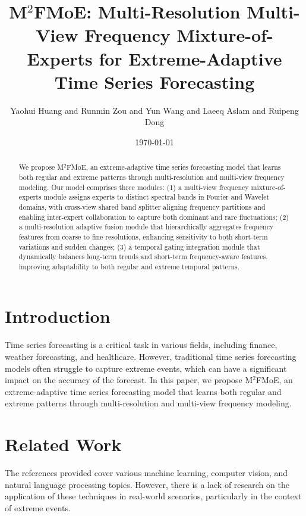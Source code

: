 \documentclass{article}
\begin{document}
\title{M$^2$FMoE: Multi-Resolution Multi-View Frequency Mixture-of-Experts for Extreme-Adaptive Time Series Forecasting}
\author{Yaohui Huang and Runmin Zou and Yun Wang and Laeeq Aslam and Ruipeng Dong}
\date{\today}

\maketitle

\begin{abstract}
We propose M$^2$FMoE, an extreme-adaptive time series forecasting model that learns both regular and extreme patterns through multi-resolution and multi-view frequency modeling. Our model comprises three modules: (1) a multi-view frequency mixture-of-experts module assigns experts to distinct spectral bands in Fourier and Wavelet domains, with cross-view shared band splitter aligning frequency partitions and enabling inter-expert collaboration to capture both dominant and rare fluctuations; (2) a multi-resolution adaptive fusion module that hierarchically aggregates frequency features from coarse to fine resolutions, enhancing sensitivity to both short-term variations and sudden changes; (3) a temporal gating integration module that dynamically balances long-term trends and short-term frequency-aware features, improving adaptability to both regular and extreme temporal patterns.
\end{abstract}

\section{Introduction}
Time series forecasting is a critical task in various fields, including finance, weather forecasting, and healthcare. However, traditional time series forecasting models often struggle to capture extreme events, which can have a significant impact on the accuracy of the forecast. In this paper, we propose M$^2$FMoE, an extreme-adaptive time series forecasting model that learns both regular and extreme patterns through multi-resolution and multi-view frequency modeling.

\section{Related Work}
The references provided cover various machine learning, computer vision, and natural language processing topics. However, there is a lack of research on the application of these techniques in real-world scenarios, particularly in the context of extreme events.
\end{document}
